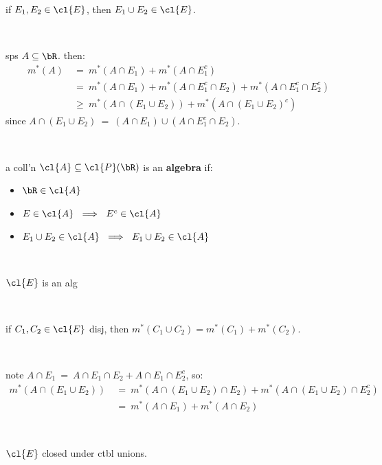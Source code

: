 \begin{lm}
	if $E_{1},E_{2}\in\cl{E}$, then $E_{1}\cup E_{2}\in\cl{E}$.
\end{lm} \

\begin{pf}
	sps $A\subseteq\bR$. then:
	\begin{align*}
		m^{*}(A)
		& \ = \ m^{*}(A\cap E_{1}) + m^{*}(A\cap E_{1}^{c}) \\
		& \ = \ m^{*}(A\cap E_{1}) + m^{*}(A\cap E_{1}^{c}\cap E_{2}) + m^{*}(A\cap E_{1}^{c}\cap E_{2}^{c}) \\
		& \ \geq \ m^{*}(A\cap(E_{1}\cup E_{2})) + m^{*}(A\cap(E_{1}\cup E_{2})^{c})
	\end{align*}
	since $A\cap(E_{1}\cup E_{2}) \ = \ (A\cap E_{1})\cup(A\cap E_{1}^{c}\cap E_{2})$.
\end{pf} \

\begin{defn}
	a coll'n $\cl{A}\subseteq\cl{P}(\bR)$ is an \textbf{algebra} if:
	\begin{itemize}
		\item $\bR\in\cl{A}$
		\item $E\in\cl{A} \ \implies \ E^{c}\in\cl{A}$
		\item $E_{1}\cup E_{2}\in\cl{A} \ \implies \ E_{1}\cup E_{2}\in\cl{A}$
	\end{itemize}
\end{defn} \

\begin{crll}
	$\cl{E}$ is an alg
\end{crll} \

\begin{prop}
	if $C_{1},C_{2}\in\cl{E}$ disj, then $m^{*}(C_{1}\cup C_{2})=m^{*}(C_{1})+m^{*}(C_{2})$.
\end{prop} \

\begin{pf}
	note $A\cap E_{1} \ = \ A\cap E_{1}\cap E_{2}+A\cap E_{1}\cap E_{2}^{c}$, so:
	\begin{align*}
		m^{*}(A\cap(E_{1}\cup E_{2}))
		& \ = \ m^{*}(A\cap(E_{1}\cup E_{2})\cap E_{2})+m^{*}(A\cap(E_{1}\cup E_{2})\cap E_{2}^{c}) \\
		& \ = \ m^{*}(A\cap E_{1}) + m^{*}(A\cap E_{2})
	\end{align*}
\end{pf} \

\begin{prop}
	$\cl{E}$ closed under ctbl unions.
\end{prop} \

